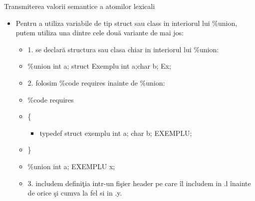 \documentclass[pdf]{beamer}
\begin{document}
\begin{frame}{Transmiterea valorii semantice a atomilor lexicali}
\begin{itemize}
	\item
	Pentru a utiliza variabile de tip {\color{red}struct} sau {\color{red}class} in interiorul lui {\color{red}\%union}, putem utiliza una dintre cele două variante de mai jos:

	\begin{itemize}
		\item<cir@1->
		1. se declară structura sau clasa chiar in {\color{red}interiorul lui \%union}:
			\linebreak

		\item[]
		\%union {int a; struct Exemplu {int a;char b;} Ex; }
			\linebreak

		\item<cir@1->
		2. folosim {\color{red}\%code requires}   inainte de {\color{red}\%union}:
			\linebreak

		\item[]
		\%code requires

		\item[]
		\{

		\begin{itemize}
			\item[]
			typedef struct exemplu {int a; char b;}	\hspace{1cm}EXEMPLU;
		\end{itemize}

		\item[]
		\}

		\item[]
		\%union {int a; EXEMPLU x; }
			\linebreak

		\item<cir@1->
		3. includem definiţia intr-un fişier header pe care îl includem in .l înainte de orice şi cumva la fel si in .y.

	\end{itemize}

\end{itemize}
\end{frame}
\end{document}
